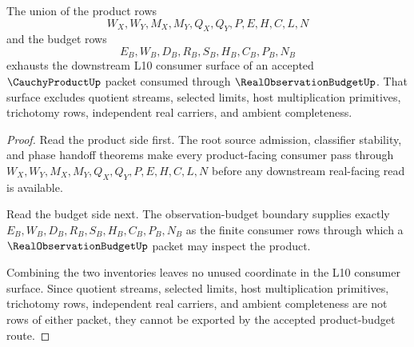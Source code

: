 \begin{theorem}
\label{thm:cauchy-product-finite-product-budget-exhaustion}
The union of the product rows
$$
W_X,W_Y,M_X,M_Y,Q_X,Q_Y,P,E,H,C,L,N
$$
and the budget rows
$$
E_B,W_B,D_B,R_B,S_B,H_B,C_B,P_B,N_B
$$
exhausts the downstream L10 consumer surface of an accepted $\CauchyProductUp$ packet consumed through $\RealObservationBudgetUp$. That surface excludes quotient streams, selected limits, host multiplication primitives, trichotomy rows, independent real carriers, and ambient completeness.
\end{theorem}
\begin{proof}
Read the product side first. The root source admission, classifier stability, and phase handoff theorems make every product-facing consumer pass through $W_X,W_Y,M_X,M_Y,Q_X,Q_Y,P,E,H,C,L,N$ before any downstream real-facing read is available.

Read the budget side next. The observation-budget boundary supplies exactly $E_B,W_B,D_B,R_B,S_B,H_B,C_B,P_B,N_B$ as the finite consumer rows through which a $\RealObservationBudgetUp$ packet may inspect the product.

Combining the two inventories leaves no unused coordinate in the L10 consumer surface. Since quotient streams, selected limits, host multiplication primitives, trichotomy rows, independent real carriers, and ambient completeness are not rows of either packet, they cannot be exported by the accepted product-budget route.
\end{proof}

